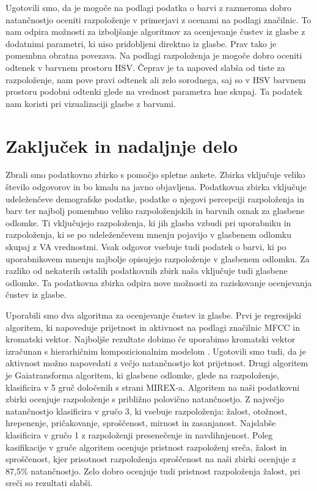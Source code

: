 \documentclass[a4paper, 12pt]{book}
\begin{document}
{Ugotovili smo, da je mogoče na podlagi podatka o barvi z razmeroma dobro natančnostjo oceniti razpoloženje v primerjavi z ocenami na podlagi značilnic. To nam odpira možnosti za izboljšanje algoritmov za ocenjevanje čustev iz glasbe z dodatnimi parametri, ki niso pridobljeni direktno iz glasbe. Prav tako je pomembna obratna povezava. Na podlagi razpoloženja je mogoče dobro oceniti odtenek v barvnem prostoru HSV. Čeprav je ta napoved slabša od tiste za razpoloženje, nam pove pravi odtenek ali zelo sorodnega, saj so v HSV barvnem prostoru podobni odtenki glede na vrednost parametra hue skupaj. Ta podatek nam koristi pri vizualizaciji glasbe z barvami.

\chapter{Zaključek in nadaljnje delo}

Zbrali smo podatkovno zbirko s pomočjo spletne ankete. Zbirka vključuje veliko število odgovorov in bo kmalu na javno objavljena. Podatkovna zbirka vključuje udeleženčeve demografske podatke, podatke o njegovi percepciji razpoloženja in barv ter najbolj pomembno veliko razpoloženjskih in barvnih oznak za glasbene odlomke. Ti vključujejo razpoloženja, ki jih glasba vzbudi pri uporabniku in razpoloženja, ki se po udeleženčevem mnenju pojavijo v glasbenem odlomku skupaj z VA vrednostmi. Vsak odgovor vsebuje tudi podatek o barvi, ki po uporabnikovem mnenju najbolje opisujejo razpoloženje v glasbenem odlomku. Za razliko od nekaterih ostalih podatkovnih zbirk naša vključuje tudi glasbene odlomke. Ta podatkovna zbirka odpira nove možnosti za raziskovanje ocenjevanja čustev iz glasbe.  

Uporabili smo dva algoritma za ocenjevanje čustev iz glasbe. Prvi je regresijski algoritem, ki napoveduje prijetnost in aktivnost na podlagi značilnic MFCC in kromatski vektor. Najboljše rezultate dobimo če uporabimo kromatski vektor izračunan s hierarhičnim kompozicionalnim modelom \cite{Pesek2013}. Ugotovili smo tudi, da je aktivnost možno napovedati z večjo natančnostjo kot prijetnost. Drugi algoritem je Gaiatransforma algoritem, ki glasbene odlomke, glede na razpoloženje, klasificira v 5 gruč določenih s strani MIREX-a. Algoritem na naši podatkovni zbirki ocenjuje razpoloženje s približno polovično natančnostjo. Z največjo natančnostjo klasificira v gručo 3, ki vsebuje razpoloženja: žalost, otožnost, hrepenenje, pričakovanje, sproščenost, mirnost in zasanjanost. Najslabše klasificira v gručo 1 z razpoloženji presenečenje in navdihnjenost. Poleg kasifikacije v gruče algoritem ocenjuje pristnost razpoloženj sreča, žalost in sproščenost, kjer prisotnost razpoloženja sproščenost na naši zbirki ocenjuje z 87,5\% natančnostjo. Zelo dobro ocenjuje tudi pristnost razpoloženja žalost, pri sreči so rezultati slabši. 

}
\end{document}
